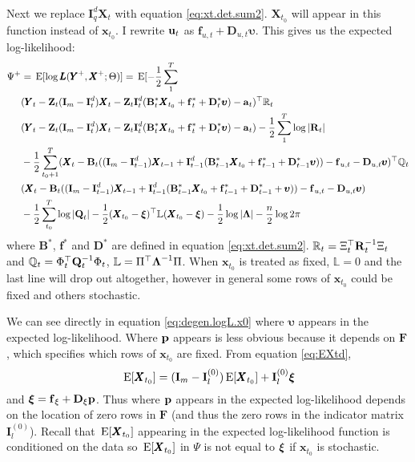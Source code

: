 \documentclass[]{article}
\def\uupsilon{\pmb{\upsilon}}
\def\xixi{\mbox{\boldmath $\xi$}}
\def\LAM{\mbox{\boldmath $\Lambda$}}
\def\LAMm{\mathbb{L}}
\def\ZZ{\mbox{$\mathbf Z$}}	\def\zz{\mbox{$\mathbf z$}}
\def\BB{\mbox{$\mathbf B$}}	\def\bb{\mbox{$\mathbf b$}}
\def\DD{\mbox{$\mathbf D$}}	\def\dd{\mbox{$\mathbf d$}}
\def\FF{\mbox{$\mathbf F$}} \def\ff{\mbox{$\mathbf f$}}
\def\II{\mbox{$\mathbf I$}} \def\ii{\mbox{$\mathbf i$}}
\def\QQ{\mbox{$\mathbf Q$}}	 \def\qq{\mbox{$\mathbf q$}}
\def\RR{\mbox{$\mathbf R$}}	 \def\rr{\mbox{$\mathbf r$}}
\def\XX{\mbox{$\pmb{X}$}}	\def\xx{\mbox{$\pmb{x}$}}
\def\YY{\mbox{$\pmb{Y}$}}	\def\yy{\mbox{$\pmb{y}$}}
\def\LL{\mbox{$\pmb{L}$}}	\def\ll{\mbox{$\pmb{l}$}}
\def\E{\,\textup{\textrm{E}}}
\begin{document}
Next we replace $\II_q^d\XX_t$ with equation \ref{eq:xt.det.sum2}.  $\XX_{t_0}$ will appear in this function instead of $\xx_{t_0}$.  I rewrite $\mbox{$\mathbf u$}_t$ as $\ff_{u,t}+\DD_{u,t}\uupsilon$.  This gives us the expected log-likelihood:
\begin{equation}\label{eq:degen.logL.x0}
\begin{split}
\Psi^+ &= \E[\log\LL(\YY^+,\XX^+ ; \Theta)] = \E[-\frac{1}{2}\sum_1^T \\
& (\YY_t - \ZZ_t(\II_m-\II_t^d)\XX_t - \ZZ_t\II_t^d(\BB^*_t\XX_{t_0} + \ff^*_t +\DD^*_t\uupsilon) - \aa_t)^\top \Rm_t\\ 
&(\YY_t - \ZZ_t(\II_m-\II_t^d)\XX_t - \ZZ_t\II_t^d(\BB^*_t\XX_{t_0} + \ff^*_t +\DD^*_t\uupsilon) - \aa_t) -\frac{1}{2}\sum_1^T\log |\RR_t|\\
& -\frac{1}{2}\sum_{t_0+1}^T (\XX_t - \BB_t ((\II_m - \II_{t-1}^d)\XX_{t-1} + \II_{t-1}^d(\BB^*_{t-1}\XX_{t_0} + \ff^*_{t-1} +\DD^*_{t-1}\uupsilon)) - \ff_{u,t} - \DD_{u,t}\uupsilon)^\top \Qm_t \\
&(\XX_t - \BB_t ((\II_m - \II_{t-1}^d)\XX_{t-1} + \II_{t-1}^d(\BB^*_{t-1}\XX_{t_0} + \ff^*_{t-1} +\DD^*_{t-1}+\uupsilon)) - \ff_{u,t} - \DD_{u,t}\uupsilon) \\
&- \frac{1}{2}\sum_{t_0}^T\log |\QQ_t|   - \frac{1}{2}(\XX_{t_0} - \xixi)^\top \LAMm(\XX_{t_0} - \xixi) - \frac{1}{2}\log |\LAM| -\frac{n}{2}\log 2\pi 
\end{split}
\end{equation}
where $\BB^*$, $\ff^*$ and $\DD^*$ are defined in equation \ref{eq:xt.det.sum2}.  $\Rm_t = \Xi_t^\top\RR_t^{-1}\Xi_t$ and $\Qm_t = \Phi_t^\top\QQ_t^{-1}\Phi_t$, $\LAMm = \Pi^\top\LAM^{-1}\Pi$.  When $\xx_{t_0}$ is treated as fixed, $\LAMm=0$ and the last line will drop out altogether, however in general some rows of $\xx_{t_0}$ could be fixed and others stochastic.  

We can see directly in equation \ref{eq:degen.logL.x0} where $\uupsilon$ appears in the expected log-likelihood.  Where $\mbox{$\mathbf p$}$ appears is less obvious because it depends on $\FF$, which specifies which rows of $\xx_{t_0}$ are fixed.  From equation \ref{eq:EXtd}, $$\E[\XX_{t_0}]=(\II_m-\II_l^{(0)})\E[\XX_{t_0}]+\II_l^{(0)}\xixi$$
and $\xixi=\ff_\xi+\DD_\xi\pp$.  Thus where $\mbox{$\mathbf p$}$ appears in the expected log-likelihood depends on the location of zero rows in $\FF$ (and thus the zero rows in the indicator matrix $\II_l^{(0)}$).  Recall that $\E[\XX_{t_0}]$ appearing in the expected log-likelihood function is conditioned on the data so $\E[\XX_{t_0}]$ in $\Psi$ is not equal to $\xixi$ if $\xx_{t_0}$ is stochastic. 
\end{document}
